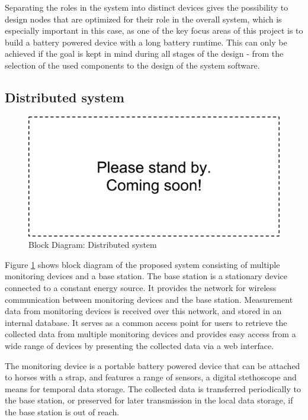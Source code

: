 Separating the roles in the system into distinct devices gives the possibility to design nodes that are optimized for their role in the overall system, which is especially important in this case, as  one of the key focus areas of this project is to build a battery powered device with a long battery runtime. This can only be achieved if the goal is kept in mind during all stages of the design - from the selection of the used components to the design of the system software.


\subsection{Distributed system}
\begin{figure}[htb]
\centering
\includegraphics[width=\textwidth]{Images/dummy}
\caption{Block Diagram: Distributed system}
\label{fig:block_system}
\end{figure}

Figure \ref{fig:block_system} shows  block diagram of the proposed system consisting of multiple monitoring devices and a base station. 
The base station is a stationary device connected to a constant energy source. It provides the network for wireless communication between monitoring devices and the base station. Measurement data from monitoring devices is received over this network, and stored in an internal database. It serves as a common access point for users to retrieve the collected data from multiple monitoring devices and provides easy access from a wide range of devices by presenting the collected data via a web interface.

The monitoring device is a portable battery powered device that can be attached to horses with a strap, and features a range of sensors, a digital stethoscope and means for temporal data storage. The collected data is transferred periodically to the base station, or preserved for later transmission in the local data storage, if the base station is out of reach.

